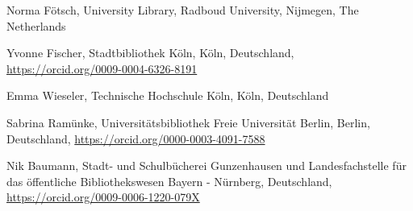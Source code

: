 \documentclass[a4paper,
fontsize=11pt,
oneside,
numbers=noperiodatend,
parskip=half-,
bibliography=totoc,
final
]{scrartcl}
\begin{document}
Norma Fötsch, University Library, Radboud University, Nijmegen, The Netherlands

Yvonne Fischer, Stadtbibliothek Köln, Köln, Deutschland, \url{https://orcid.org/0009-0004-6326-8191}

Emma Wieseler, Technische Hochschule Köln, Köln, Deutschland

Sabrina Ramünke, Universitätsbibliothek Freie Universität Berlin, Berlin, Deutschland, \url{https://orcid.org/0000-0003-4091-7588}

Nik Baumann, Stadt- und Schulbücherei Gunzenhausen und Landesfachstelle für das öffentliche Bibliothekswesen Bayern - Nürnberg, Deutschland, \url{https://orcid.org/0009-0006-1220-079X}
\end{document}
